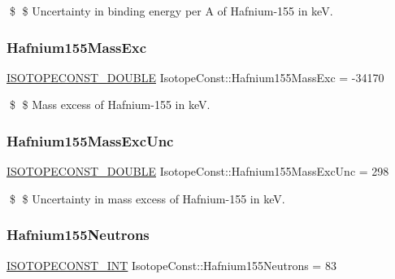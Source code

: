 \$ \$ Uncertainty in binding energy per A of Hafnium-\/155 in keV. \mbox{\label{group___isotope_const-_hafnium-_hf155_ga83140c9862b00470e53f24b49a87edab}} 
\subsubsection{\texorpdfstring{Hafnium155\+Mass\+Exc}{Hafnium155MassExc}}
{\footnotesize\ttfamily \mbox{\hyperlink{group___isotope_const-_macros_ga8f45a7272ce02c0b4c65c44636ed719a}{I\+S\+O\+T\+O\+P\+E\+C\+O\+N\+S\+T\+\_\+\+D\+O\+U\+B\+LE}} Isotope\+Const\+::\+Hafnium155\+Mass\+Exc = -\/34170}

\$ \$ Mass excess of Hafnium-\/155 in keV. \mbox{\label{group___isotope_const-_hafnium-_hf155_ga9edde1d47402eb0ae2d25834088bec8c}} 
\subsubsection{\texorpdfstring{Hafnium155\+Mass\+Exc\+Unc}{Hafnium155MassExcUnc}}
{\footnotesize\ttfamily \mbox{\hyperlink{group___isotope_const-_macros_ga8f45a7272ce02c0b4c65c44636ed719a}{I\+S\+O\+T\+O\+P\+E\+C\+O\+N\+S\+T\+\_\+\+D\+O\+U\+B\+LE}} Isotope\+Const\+::\+Hafnium155\+Mass\+Exc\+Unc = 298}

\$ \$ Uncertainty in mass excess of Hafnium-\/155 in keV. \mbox{\label{group___isotope_const-_hafnium-_hf155_ga161be35584a2e47b450b8576791bc240}} 
\subsubsection{\texorpdfstring{Hafnium155\+Neutrons}{Hafnium155Neutrons}}
{\footnotesize\ttfamily \mbox{\hyperlink{group___isotope_const-_macros_ga5f18360b3e99483a35c32d789e62621c}{I\+S\+O\+T\+O\+P\+E\+C\+O\+N\+S\+T\+\_\+\+I\+NT}} Isotope\+Const\+::\+Hafnium155\+Neutrons = 83}

